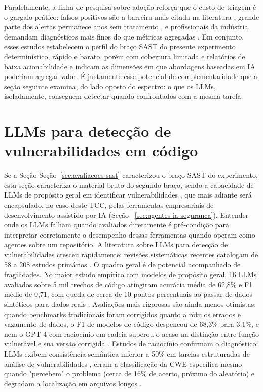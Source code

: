 Paralelamente, a linha de pesquisa sobre adoção reforça que o custo de triagem é o gargalo prático: falsos positivos são a barreira mais citada na literatura \cite{Wadhams2024SASTBarriers}, grande parte dos alertas permanece anos sem tratamento \cite{Aloraini2019SASTWarnings}, e profissionais da indústria demandam diagnósticos mais finos do que métricas agregadas \cite{Li2025IndustrySAST}. Em conjunto, esses estudos estabelecem o perfil do braço SAST do presente experimento determinístico, rápido e barato, porém com cobertura limitada e relatórios de baixa acionabilidade e indicam as dimensões em que abordagens baseadas em IA poderiam agregar valor. É justamente esse potencial de complementaridade que a seção seguinte examina, do lado oposto do espectro: o que os LLMs, isoladamente, conseguem detectar quando confrontados com a mesma tarefa.


\section{LLMs para detecção de vulnerabilidades em código}\label{sec:llms-deteccao-vulnerabilidades}
Se a Seção Seção~\ref{sec:avaliacoes-sast} caracterizou o braço SAST do experimento, esta seção caracteriza o material bruto do segundo braço, sendo a capacidade de LLMs de propósito geral em identificar vulnerabilidades , que mais adiante será encapsulado, no caso deste TCC, pelas ferramentas empresariais de desenvolvimento assistido por IA (Seção ~\ref{sec:agentes-ia-seguranca}). Entender onde os LLMs falham quando avaliados diretamente é pré-condição para interpretar corretamente o desempenho dessas ferramentas quando operam como agentes sobre um repositório. A literatura sobre LLMs para detecção de vulnerabilidades cresceu rapidamente: revisões sistemáticas recentes catalogam de 58 a 208 estudos primários \cite{Sheng2025LLMSurvey, Zhou2025LLMReview, Germano2025LLMSLR}. O quadro geral é de potencial acompanhado de fragilidades. No maior estudo empírico com modelos de propósito geral, 16 LLMs avaliados sobre 5 mil trechos de código atingiram acurácia média de 62,8\% e F1 médio de 0,71, com queda de cerca de 10 pontos percentuais ao passar de dados sintéticos para dados reais \cite{Khare2025LLMEffectiveness}. Avaliações mais rigorosas são ainda menos otimistas: quando benchmarks tradicionais foram corrigidos quanto a rótulos errados e vazamento de dados, o F1 de modelos de código despencou de 68,3\% para 3,1\%, e nem o GPT-4 com raciocínio em cadeia superou o acaso na distinção entre função vulnerável e sua versão corrigida \cite{Ding2025CodeLMVuln}. Estudos de raciocínio confirmam o diagnóstico: LLMs exibem consistência semântica inferior a 50\% em tarefas estruturadas de análise de vulnerabilidades \cite{Li2025SVTrustEval}, erram a classificação da CWE específica mesmo quando "percebem" o problema (cerca de 16\% de acerto, próximo do aleatório) \cite{Gaspar2025OpenLLM, Lin2025LLMCompare} e degradam a localização em arquivos longos \cite{Sovrano2025LostInEnd}.

